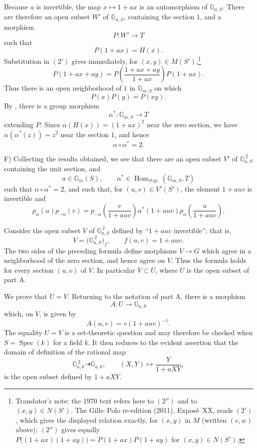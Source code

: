 Because \(a\) is invertible, the map \(x\mapsto1+ax\) is an
automorphism of \(\mathbb G_{a,S}\). There are therefore an open
subset \(W'\) of \(\mathbb G_{a,S}\), containing the section \(1\),
and a morphism
\[
  P\colon W'\longrightarrow T
\]
such that
\[
  P(1+ax)=H(x).
\]
Substitution in \((2')\) gives immediately, for
\((x,y)\in M(S')\),\footnote{Translator's note: the 1970 text refers here to \((2'')\) and to
\((x,y)\in N(S')\). The Gille--Polo re-edition (2011), Exposé~XX, reads \((2')\), which gives the
displayed relation exactly, for \((x,y)\) in \(M\) (written \((v,w)\) above); \((2'')\) gives
equally \(P\bigl((1+ax)(1+ay)\bigr)=P(1+ax)P(1+ay)\) for \((x,y)\in N(S')\).}
\[
  P(1+ax+ay)
   =P\left(\frac{1+ax+ay}{1+ax}\right)P(1+ax).
\]
Thus there is an open neighborhood of \(1\) in
\(\mathbb G_{m,S}\) on which
\[
  P(x)P(y)=P(xy).
\]
By , there is a group morphism
\[
  \alpha^\ast\colon\mathbb G_{m,S}\longrightarrow T
\]
extending \(P\). Since
\(\alpha(H(x))=(1+ax)^2\) near the zero section, we have
\(\alpha(\alpha^\ast(z))=z^2\) near the section \(1\), and hence
\[
  \alpha\circ\alpha^\ast=2.
\]

\textup{F)}
Collecting the results obtained, we see that there are an open
subset \(V'\) of \(\mathbb G_{a,S}^{\,2}\) containing the unit
section, and
\[
  a\in\mathbb G_m(S),\qquad
  \alpha^\ast\in
    \operatorname{Hom}_{S\text{-gr.}}(\mathbb G_{m,S},T)
\]
such that \(\alpha\circ\alpha^\ast=2\), and such that, for
\((u,v)\in V'(S')\), the element \(1+auv\)
is invertible and
\[
  p_\alpha(u)p_{-\alpha}(v)
   =p_{-\alpha}\left(\frac{v}{1+auv}\right)
      \alpha^\ast(1+auv)
      p_\alpha\left(\frac{u}{1+auv}\right).
\]

Consider the open subset \(V\) of \(\mathbb G_{a,S}^{\,2}\) defined
by ``\(1+auv\) invertible''; that is,
\[
  V=\bigl(\mathbb G_{a,S}^{\,2}\bigr)_f,
  \qquad f(u,v)=1+auv.
\]
The two sides of the preceding formula define morphisms
\(V\to G\) which agree in a neighborhood of the zero section,
and hence agree on \(V\). Thus the formula holds for every
section \((u,v)\) of \(V\). In particular \(V\subset U\),
where \(U\) is the open subset of part A.

We prove that \(U=V\). Returning to the notation of part A, there
is a morphism
\[
  A\colon U\longrightarrow\mathbb G_{a,S}
\]
which, on \(V\), is given by
\[
  A(u,v)=v(1+auv)^{-1}.
\]
The equality \(U=V\) is a set-theoretic question and may therefore
be checked when \(S=\operatorname{Spec}(k)\) for a field \(k\).
It then reduces to the evident assertion that the domain of
definition of the rational map
\[
  \mathbb G_{a,k}^{\,2}\dashrightarrow\mathbb G_{a,k},
  \qquad
  (X,Y)\longmapsto\frac{Y}{1+aXY},
\]
is the open subset defined by \(1+aXY\).

